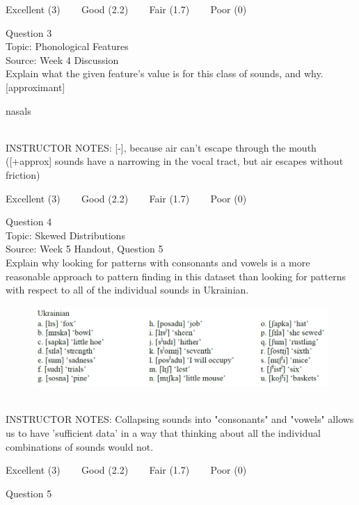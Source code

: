 \documentclass[12pt]{article}
\begin{document}
\vfill
Excellent (3) ~~~ Good (2.2) ~~~ Fair (1.7) ~~~ Poor (0)
\newpage

{\large Question 3}\\

Topic: Phonological Features\\
Source: Week 4 Discussion\\

Explain what the given feature’s value is for this class of sounds, and why.\\

{[approximant]}

nasals


~\\
INSTRUCTOR NOTES: [-], because air can't escape through the mouth ([+approx] sounds have a narrowing in the vocal tract, but air escapes without friction)


\vfill
Excellent (3) ~~~ Good (2.2) ~~~ Fair (1.7) ~~~ Poor (0)
\newpage

{\large Question 4}\\

Topic: Skewed Distributions\\
Source: Week 5 Handout, Question 5\\

Explain why looking for patterns with consonants and vowels is a more reasonable approach to pattern finding in this dataset than looking for patterns with respect to all of the individual sounds in Ukrainian.\\

\begin{figure}[H]
\includegraphics{../images/ukrainian.png}
\end{figure}

~\\
INSTRUCTOR NOTES: Collapsing sounds into "consonants" and "vowels" allows us to have 'sufficient data' in a way that thinking about all the individual combinations of sounds would not.


\vfill
Excellent (3) ~~~ Good (2.2) ~~~ Fair (1.7) ~~~ Poor (0)
\newpage

{\large Question 5}\\
\end{document}
